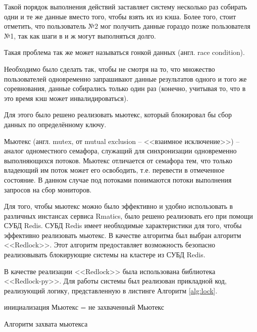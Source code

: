 Такой порядок выполнения действий заставляет систему несколько раз собирать одни и те же данные вместо того, чтобы взять их из кэша. Более того, стоит отметить, что пользователь №2 мог получить данные гораздо позже пользователя №1, так как шаги в и ж могут выполняться долго.

Такая проблема так же может называться гонкой данных (англ. race condition)\cite{race_condition}.

Необходимо было сделать так, чтобы не смотря на то, 
что множество пользователей одновременно запрашивают данные результатов одного и того же соревнования, 
данные собирались только один раз (конечно, учитывая то, что в это время кэш может инвалидироваться).

Для этого было решено реализовать мьютекс, который блокировал бы сбор данных по определённому ключу.

Мьютекс (англ. mutex, от mutual exclusion -- <<взаимное исключение>>) -- аналог одноместного семафора, служащий для синхронизации одновременно выполняющихся потоков. 
Мьютекс отличается от семафора тем, что только владеющий им поток может его освободить, т.е. перевести в отмеченное состояние. 
В данном случае под потоками понимаются потоки выполнения запросов на сбор мониторов.

Для того, чтобы мьютекс можно было эффективно и удобно использовать в различных инстансах сервиса Rmatics, 
было решено реализовать его при помощи СУБД Redis. 
СУБД Redis имеет необходимые характеристики для того, 
чтобы эффективно реализовать мьютекс\cite{carlson2013redis}.
В качестве алгоритма был выбран алгоритм <<Redlock>>\cite{redis_lock_base}.
Этот алгоритм предоставляет возможность безопасно реализовывать блокирующие системы на кластере из СУБД Redis\cite{redis_lock_answer}.

В качестве реализации <<Redlock>> была использована библиотека <<Redlock-py>>.
Для работы системы был реализован прикладной код, реализующий логику, представленную в листинге Алгоритм \ref{alg:lock}. 

\begin{rualgorithm}[H]
 инициализация\;
 Мьютекс = не захваченный Мьютекс\;
 \caption{Алгоритм захвата мьютекса}
 \label{alg:lock}
\end{rualgorithm}

